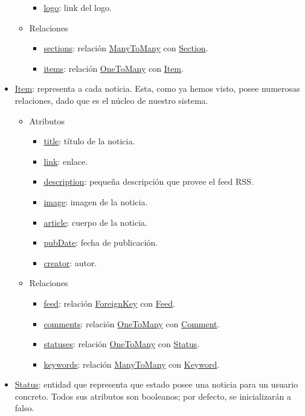 \begin{itemize}
\begin{itemize}
\begin{itemize}
            \item \underline{logo}: link del logo.
        \end{itemize}
        \item Relaciones
        \begin{itemize}
            \item \underline{sections}: relación \underline{ManyToMany} con \underline{Section}.
            \item \underline{items}: relación \underline{OneToMany} con \underline{Item}.
        \end{itemize}
    \end{itemize}
    \item \underline{Item}: representa a cada noticia. Esta, como ya hemos visto, posee numerosas relaciones, dado que es el núcleo de nuestro sistema.
    \begin{itemize}
        \item Atributos
        \begin{itemize}
            \item \underline{title}: título de la noticia.
            \item \underline{link}: enlace.
            \item \underline{description}: pequeña descripción que provee el feed RSS.
            \item \underline{image}: imagen de la noticia.
            \item \underline{article}: cuerpo de la noticia.
            \item \underline{pubDate}: fecha de publicación.
            \item \underline{creator}: autor.
        \end{itemize}
        \item Relaciones
        \begin{itemize}
            \item \underline{feed}: relación \underline{ForeignKey} con \underline{Feed}.
            \item \underline{comments}: relación \underline{OneToMany} con \underline{Comment}.
            \item \underline{statuses}: relación \underline{OneToMany} con \underline{Status}.
            \item \underline{keywords}: relación \underline{ManyToMany} con \underline{Keyword}.
        \end{itemize}
    \end{itemize}
    \item \underline{Status}: entidad que representa que estado posee una noticia para un usuario concreto. Todos sus atributos son booleanos; por defecto, se inicializarán a falso.

\end{itemize}
